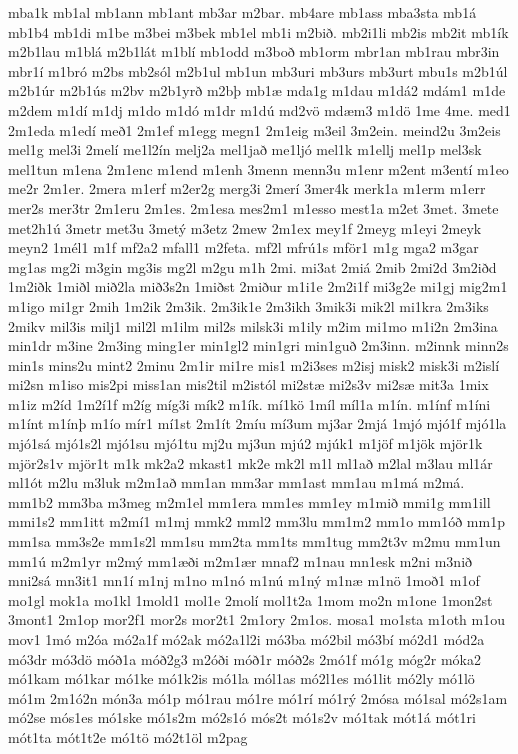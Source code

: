 {mba1k
mb1al
mb1ann
mb1ant
mb3ar
m2bar.
mb4are
mb1ass
mba3sta
mb1á
mb1b4
mb1di
m1be
m3bei
m3bek
mb1el
mb1i
m2bið.
mb2i1li
mb2is
mb2it
mb1ík
m2b1lau
m1blá
m2b1lát
m1blí
mb1odd
m3boð
mb1orm
mbr1an
mb1rau
mbr3in
mbr1í
m1bró
m2bs
mb2sól
m2b1ul
mb1un
mb3uri
mb3urs
mb3urt
mbu1s
m2b1úl
m2b1úr
m2b1ús
m2bv
m2b1yrð
m2bþ
mb1æ
mda1g
m1dau
m1dá2
mdám1
m1de
m2dem
m1dí
m1dj
m1do
m1dó
m1dr
m1dú
md2vö
mdæm3
m1dö
1me
4me.
med1
2m1eda
m1edí
með1
2m1ef
m1egg
megn1
2m1eig
m3eil
3m2ein.
meind2u
3m2eis
mel1g
mel3i
2melí
me1l2ín
melj2a
mel1jað
me1ljó
mel1k
m1ellj
mel1p
mel3sk
mel1tun
m1ena
2m1enc
m1end
m1enh
3menn
menn3u
m1enr
m2ent
m3entí
m1eo
me2r
2m1er.
2mera
m1erf
m2er2g
merg3i
2merí
3mer4k
merk1a
m1erm
m1err
mer2s
mer3tr
2m1eru
2m1es.
2m1esa
mes2m1
m1esso
mest1a
m2et
3met.
3mete
met2h1ú
3metr
met3u
3metý
m3etz
2mew
2m1ex
mey1f
2meyg
m1eyi
2meyk
meyn2
1mél1
m1f
mf2a2
mfall1
m2feta.
mf2l
mfrú1s
mför1
m1g
mga2
m3gar
mg1as
mg2i
m3gin
mg3is
mg2l
m2gu
m1h
2mi.
mi3at
2miá
2mib
2mi2d
3m2iðd
1m2iðk
1miðl
mið2la
mið3s2n
1miðst
2miður
m1i1e
2m2i1f
mi3g2e
mi1gj
mig2m1
m1igo
mi1gr
2mih
1m2ik
2m3ik.
2m3ik1e
2m3ikh
3mik3i
mik2l
mi1kra
2m3iks
2mikv
mil3is
milj1
mil2l
m1ilm
mil2s
milsk3i
m1ily
m2im
mi1mo
m1i2n
2m3ina
min1dr
m3ine
2m3ing
ming1er
min1gl2
min1gri
min1guð
2m3inn.
m2innk
minn2s
min1s
mins2u
mint2
2minu
2m1ir
mi1re
mis1
m2i3ses
m2isj
misk2
misk3i
m2islí
mi2sn
m1iso
mis2pi
miss1an
mis2til
m2istól
mi2stæ
mi2s3v
mi2sæ
mit3a
1mix
m1iz
m2íd
1m2í1f
m2íg
míg3i
mík2
m1ík.
mí1kö
1míl
míl1a
m1ín.
m1ínf
m1íni
m1ínt
m1ínþ
m1ío
mír1
mí1st
2m1ít
2míu
mí3um
mj3ar
2mjá
1mjó
mjó1f
mjó1la
mjó1sá
mjó1s2l
mjó1su
mjó1tu
mj2u
mj3un
mjú2
mjúk1
m1jöf
m1jök
mjör1k
mjör2s1v
mjör1t
m1k
mk2a2
mkast1
mk2e
mk2l
m1l
ml1að
m2lal
m3lau
ml1ár
ml1ót
m2lu
m3luk
m2m1að
mm1an
mm3ar
mm1ast
mm1au
m1má
m2má.
mm1b2
mm3ba
m3meg
m2m1el
mm1era
mm1es
mm1ey
m1mið
mmi1g
mm1ill
mmi1s2
mm1itt
m2mí1
m1mj
mmk2
mml2
mm3lu
mm1m2
mm1o
mm1óð
mm1p
mm1sa
mm3s2e
mm1s2l
mm1su
mm2ta
mm1ts
mm1tug
mm2t3v
m2mu
mm1un
mm1ú
m2m1yr
m2mý
mm1æði
m2m1ær
mnaf2
m1nau
mn1esk
m2ni
m3nið
mni2sá
mn3it1
mn1í
m1nj
m1no
m1nó
m1nú
m1ný
m1næ
m1nö
1moð1
m1of
mo1gl
mok1a
mo1kl
1mold1
mol1e
2molí
mol1t2a
1mom
mo2n
m1one
1mon2st
3mont1
2m1op
mor2f1
mor2s
mor2t1
2m1ory
2m1os.
mosa1
mo1sta
m1oth
m1ou
mov1
1mó
m2óa
mó2a1f
mó2ak
mó2a1l2i
mó3ba
mó2bil
mó3bí
mó2d1
mód2a
mó3dr
mó3dö
móð1a
móð2g3
m2óði
móð1r
móð2s
2mó1f
mó1g
móg2r
móka2
mó1kam
mó1kar
mó1ke
mó1k2is
mó1la
mól1as
mó2l1es
mó1lit
mó2ly
mó1lö
mó1m
2m1ó2n
món3a
mó1p
mó1rau
mó1re
mó1rí
mó1rý
2mósa
mó1sal
mó2s1am
mó2se
mós1es
mó1ske
mó1s2m
mó2s1ó
mós2t
mó1s2v
mó1tak
mót1á
mót1ri
mót1ta
mót1t2e
mó1tö
mó2t1öl
m2pag
}
